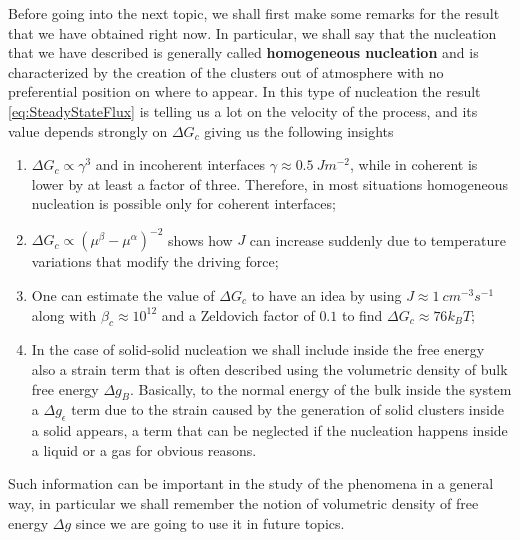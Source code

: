 Before going into the next topic, we shall first make some remarks for the result that we have obtained right now. In particular, we shall say that the nucleation that we have described is generally called \textbf{homogeneous nucleation} and is characterized by the creation of the clusters out of atmosphere with no preferential position on where to appear. In this type of nucleation the result \eqref{eq:SteadyStateFlux} is telling us a lot on the velocity of the process, and its value depends strongly on $\Delta G_c$ giving us the following insights
\begin{enumerate}[label*=\protect\fbox{\arabic{enumi}}]
    \item $\Delta G_c \propto \gamma^3$ and in incoherent interfaces $\gamma \approx \SI{0.5}{Jm^{-2}}$, while in coherent is lower by at least a factor of three. Therefore, in most situations homogeneous nucleation is possible only for coherent interfaces;
    \item $\Delta G_c \propto (\mu^\beta - \mu^\alpha)^{-2}$ shows how $J$ can increase suddenly due to temperature variations that modify the driving force;
    \item One can estimate the value of $\Delta G_c$ to have an idea by using $J\approx \SI{1}{cm^{-3}s^{-1}}$ along with $\beta_c \approx 10^12$ and a Zeldovich factor of $0.1$ to find $\Delta G_c \approx 76k_BT$;
    \item In the case of solid-solid nucleation we shall include inside the free energy also a strain term that is often described using the volumetric density of bulk free energy $\Delta g_B$. Basically, to the normal energy of the bulk inside the system a $\Delta g_\epsilon$ term due to the strain caused by the generation of solid clusters inside a solid appears, a term that can be neglected if the nucleation happens inside a liquid or a gas for obvious reasons.
\end{enumerate}
Such information can be important in the study of the phenomena in a general way, in particular we shall remember the notion of volumetric density of free energy $\Delta g$ since we are going to use it in future topics.

